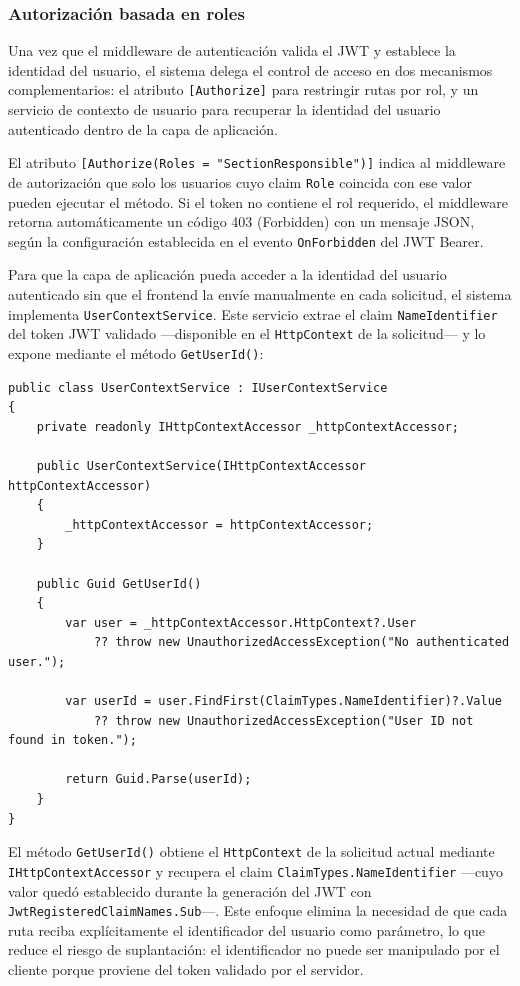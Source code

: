 \subsubsection{Autorización basada en roles}

Una vez que el middleware de autenticación valida el JWT y establece la identidad del usuario, el sistema delega el control de acceso en dos mecanismos complementarios: el atributo \texttt{[Authorize]} para restringir rutas por rol, y un servicio de contexto de usuario para recuperar la identidad del usuario autenticado dentro de la capa de aplicación.

El atributo \texttt{[Authorize(Roles = "SectionResponsible")]} indica al middleware de autorización que solo los usuarios cuyo claim \texttt{Role} coincida con ese valor pueden ejecutar el método. Si el token no contiene el rol requerido, el middleware retorna automáticamente un código 403 (Forbidden) con un mensaje JSON, según la configuración establecida en el evento \texttt{OnForbidden} del JWT Bearer.

Para que la capa de aplicación pueda acceder a la identidad del usuario autenticado sin que el frontend la envíe manualmente en cada solicitud, el sistema implementa \texttt{UserContextService}. Este servicio extrae el claim \texttt{NameIdentifier} del token JWT validado —disponible en el \texttt{HttpContext} de la solicitud— y lo expone mediante el método \texttt{GetUserId()}:

\begin{lstlisting}[language={[Sharp]C}, caption={Servicio de contexto de usuario autenticado}, label={lst:usercontext}]
public class UserContextService : IUserContextService
{
    private readonly IHttpContextAccessor _httpContextAccessor;

    public UserContextService(IHttpContextAccessor httpContextAccessor)
    {
        _httpContextAccessor = httpContextAccessor;
    }

    public Guid GetUserId()
    {
        var user = _httpContextAccessor.HttpContext?.User
            ?? throw new UnauthorizedAccessException("No authenticated user.");

        var userId = user.FindFirst(ClaimTypes.NameIdentifier)?.Value
            ?? throw new UnauthorizedAccessException("User ID not found in token.");

        return Guid.Parse(userId);
    }
}
\end{lstlisting}

El método \texttt{GetUserId()} obtiene el \texttt{HttpContext} de la solicitud actual mediante \texttt{IHttpContextAccessor} y recupera el claim \texttt{ClaimTypes.NameIdentifier} —cuyo valor quedó establecido durante la generación del JWT con \texttt{JwtRegisteredClaimNames.Sub}—.
Este enfoque elimina la necesidad de que cada ruta reciba explícitamente el identificador del usuario como parámetro, lo que reduce el riesgo de suplantación: el identificador no puede ser manipulado por el cliente porque proviene del token validado por el servidor.

